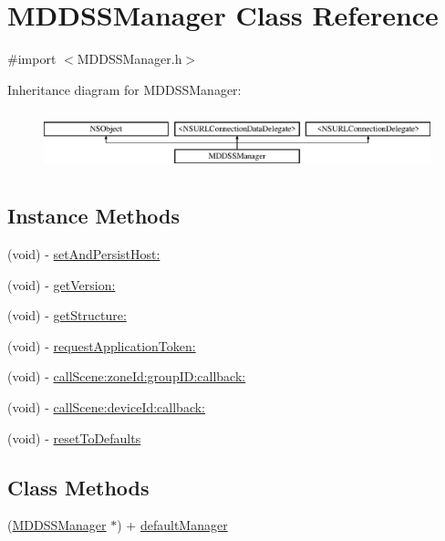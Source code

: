 \hypertarget{interface_m_d_d_s_s_manager}{\section{M\-D\-D\-S\-S\-Manager Class Reference}
\label{interface_m_d_d_s_s_manager}
}


{\ttfamily \#import $<$M\-D\-D\-S\-S\-Manager.\-h$>$}

Inheritance diagram for M\-D\-D\-S\-S\-Manager\-:\begin{figure}[H]
\begin{center}
\leavevmode
\includegraphics[height=1.744548cm]{interface_m_d_d_s_s_manager}
\end{center}
\end{figure}
\subsection*{Instance Methods}
\begin{DoxyCompactItemize}
\item 
(void) -\/ \hyperlink{interface_m_d_d_s_s_manager_a7fc82977a968af77139dfd04e407a242}{set\-And\-Persist\-Host\-:}
\item 
(void) -\/ \hyperlink{interface_m_d_d_s_s_manager_a74358d521e85fc2a1a04f15bd8b3954e}{get\-Version\-:}
\item 
(void) -\/ \hyperlink{interface_m_d_d_s_s_manager_a372f9b7faa41788df9a0051cbb3001d6}{get\-Structure\-:}
\item 
(void) -\/ \hyperlink{interface_m_d_d_s_s_manager_a132057831e843d4888c44f7147ad28a1}{request\-Application\-Token\-:}
\item 
(void) -\/ \hyperlink{interface_m_d_d_s_s_manager_a5380dc94b95172a6131901f23a73bd7d}{call\-Scene\-:zone\-Id\-:group\-I\-D\-:callback\-:}
\item 
(void) -\/ \hyperlink{interface_m_d_d_s_s_manager_a33e9c999b7b7547d42c4102097102ee8}{call\-Scene\-:device\-Id\-:callback\-:}
\item 
(void) -\/ \hyperlink{interface_m_d_d_s_s_manager_afd4b532e4a25c628ff150eb2199515da}{reset\-To\-Defaults}
\end{DoxyCompactItemize}
\subsection*{Class Methods}
\begin{DoxyCompactItemize}
\item 
(\hyperlink{interface_m_d_d_s_s_manager}{M\-D\-D\-S\-S\-Manager} $\ast$) + \hyperlink{interface_m_d_d_s_s_manager_af0359d38979df1d414575dfb7aa6b537}{default\-Manager}
\end{DoxyCompactItemize}
